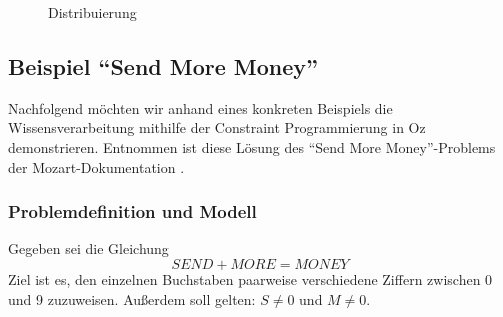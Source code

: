 \begin{figure}
  \centering {} 
  \caption{Distribuierung}
  \label{fig:distribuierung-suchbaum}
\end{figure}

\subsection{Beispiel "`Send More Money"'}
Nachfolgend möchten wir anhand eines konkreten Beispiels die 
Wissensverarbeitung mithilfe der Constraint Programmierung in Oz demonstrieren. 
Entnommen ist diese Lösung des "`Send More Money"'-Problems der 
Mozart-Dokumentation \cite[Finite Domain Constraint Programming in
  Oz, Chapter 3.2]{url:mozart-documentation}.

\subsubsection{Problemdefinition und Modell}
Gegeben sei die Gleichung $$SEND + MORE = MONEY$$ Ziel ist es, den einzelnen
Buchstaben paarweise verschiedene Ziffern zwischen 0 und 9 zuzuweisen. Außerdem
soll gelten: $S \neq 0$ und $M \neq 0$.

